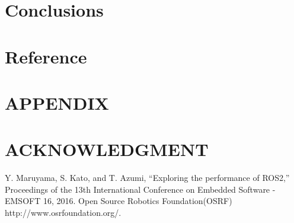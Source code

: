 \documentclass[letterpaper, 10 pt, conference]{ieeeconf}  %
\begin{document}
\section{Conclusions}\label{conclusions}

\section{Reference}\label{reference}
\addtolength{\textheight}{-12cm}   %
\section*{APPENDIX}

\section*{ACKNOWLEDGMENT}
\begin{thebibliography}{99}

 Y. Maruyama, S. Kato, and T. Azumi, “Exploring the performance of ROS2,” Proceedings of the 13th International Conference on Embedded Software - EMSOFT 16, 2016. 
 Open Source Robotics Foundation(OSRF) http://www.osrfoundation.org/.

\end{thebibliography}
\end{document}
